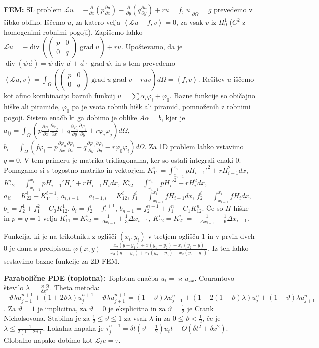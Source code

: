 \documentclass[a4paper,12pt]{article}
\theoremstyle{definition}
\renewcommand{\phi}{\varphi}
\renewcommand{\theta}{\vartheta}
\newcommand{\grad}{\operatorname{grad}}
\renewcommand{\div}{\operatorname{div}}
\newcommand{\dpar}[2]{\ensuremath{\frac{\partial #1}{\partial #2}}}
\newcommand{\dpx}[1]{\dpar{#1}{x}}
\newcommand{\dpy}[1]{\dpar{#1}{y}}
\newcommand{\ls}{\left\langle}
\newcommand{\rs}{\right\rangle}
\renewcommand{\L}{\mathcal{L}}
\newcommand{\dx}{\delta x}
\newcommand{\dt}{\delta t}
\begin{document}
\textbf{FEM:}
SL problem $\L u = -\dpx{}\left(p\dpx{u}\right) - \dpy{}\left(q\dpy{u}\right) + ru = f$,
$u|_{\partial \Omega} = g$ prevedemo v šibko obliko. Iščemo $u$, za katero velja
$\ls \L u - f, v\rs = 0$, za vsak $v$ iz $H_0^1$ ($C^2$ z homogenimi robnimi pogoji).
Zapišemo lahko $\L u = -\div\left(\left(
\begin{smallmatrix} p & 0 \\ 0 & q \end{smallmatrix} \right) \grad u\right) + ru$.
Upoštevamo, da je $\div(\psi \vec{a}) = \psi \div\vec{a} + \vec{a}\cdot \grad{\psi}$, in s tem prevedemo
$\ls \L u, v\rs = \int_\Omega (\left(\begin{smallmatrix} p & 0 \\ 0 & q \end{smallmatrix} \right)\grad u \grad v + ruv) d\Omega = \ls f, v\rs$.
Rešitev $u$ iščemo kot afino kombinacijo baznih funkcij $u = \sum \alpha_i \phi_i + \phi_0$. Bazne funkcije so običajno hiške ali piramide, $\phi_0$ pa je vsota robnih hišk ali piramid, pomnoženih z robnimi pogoji.
Sistem enačb ki ga dobimo je oblike $A \alpha = b$, kjer je
$a_{ij} = \int_\Omega (p\dpx{\phi_i}\dpx{\phi_j} + q\dpy{\phi_i}\dpy{\phi_j} + r\phi_i\phi_j)d\Omega$, $b_i = \int_\Omega (f\phi_i - p\dpx{\phi_0}\dpx{\phi_i} - q\dpy{\phi_0}\dpy{\phi_i}-r\phi_0\phi_i)d\Omega$.
Za 1D problem lahko vstavimo $q= 0$. V tem primeru je matrika tridiagonalna, ker so ostali integrali enaki 0.
Pomagamo si s togostno matriko in vektorjem
$K^i_{11} = \int_{x_{i-1}}^{x_i} p H_{i-1}'^2+rH_{i-1}^2dx$,
$K^i_{12} = \int_{x_{i-1}}^{x_i} p H_{i-1}'H_{i}'+rH_{i-1}H_idx$,
$K^i_{22} = \int_{x_{i-1}}^{x_i} p H_{i}'^2+rH_{i}^2dx$,
$a_{ii} = K_{22}^i + K_{11}^{i+1}$,
$a_{i,i-1} = a_{i-1,i} = K_{12}^i$,
$f_1^i = \int_{x_{i-1}}^{x_i}fH_{i-1}dx$,
$f_2^i = \int_{x_{i-1}}^{x_i}fH_{i}dx$,
$b_1 = f_2^1 + f_1^2 - C_0K_{12}^1$,
$b_i = f^i_2 + f_1^{i+1}$,
$b_{n-1} = f_2^{n-1} + f_1^n - C_1K_{12}^n$.
Če so $H$ hiške in $p = q = 1$ velja $K_{11}^i = K_{22}^i = \frac{1}{\Delta x_{i-1}} + \frac13\Delta x_{i-1}$, $K^i_{12} = K^i_{21} = -\frac{1}{\Delta x_{i-1}} + \frac16\Delta x_{i-1}$.

Funkcija, ki je na trikotniku z oglišči $(x_i, y_i)$ v tretjem oglišču 1 in v prvih dveh 0 je dana s predpisom $\phi(x, y) = \frac{x_2 \left(y-y_1\right)+x \left(y_1-y_2\right)+x_1 \left(y_2-y\right)}{x_3 \left(y_1-y_2\right)+x_1 \left(y_2-y_3\right)+x_2 \left(y_3-y_1\right)}$. Iz teh lahko sestavimo bazne funkcije za 2D FEM.

\textbf{Parabolične PDE (toplotna):}
Toplotna enačba $u_t = \varkappa u_{xx}$. Courantovo število $\lambda = \frac{\varkappa \dt}{\dx^2}$.
Theta metoda:
$-\theta\lambda u_{j-1}^{n+1} +
(1+2\theta\lambda)u_j^{n+1} -
\theta\lambda u_{j+1}^{n+1} =
(1-\theta)\lambda u_{j-1}^n +
(1- 2(1-\theta)\lambda) u_j^n +
(1-\theta)\lambda u_{j+1}^n$.
Za $\theta = 1$ je implicitna, za $\theta = 0$ je eksplicitna in za $\theta = \frac12$ je Crank Nicholsovona.
Stabilna je za $\frac12 \leq \theta \leq 1$ za vsak $\lambda$ in za
$0 \leq \theta < \frac12$, če je $\lambda \leq \frac{1}{2(1-2\theta)}$.
Lokalna napaka je $\tau_j^{n+1} = \dt(\theta-\frac12)u_tt + O(\dt^2+\dx^2)$.
Globalno napako dobimo kot $\L_\delta e = \tau$.
\end{document}
